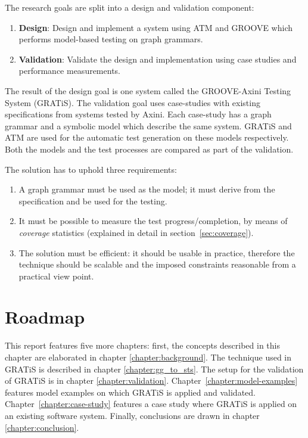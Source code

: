 The research goals are split into a design and validation component:
\begin{enumerate}
    \item \textbf{Design}: Design and implement a system using ATM and GROOVE which performs model-based testing on graph grammars.
    \item \textbf{Validation}: Validate the design and implementation using case studies and performance measurements.
\end{enumerate}

The result of the design goal is one system called the GROOVE-Axini Testing System (GRATiS). The validation goal uses case-studies with existing specifications from systems tested by Axini. Each case-study has a graph grammar and a symbolic model which describe the same system. GRATiS and ATM are used for the automatic test generation on these models respectively. Both the models and the test processes are compared as part of the validation.

The solution has to uphold three requirements:
\begin{enumerate}
\item A graph grammar must be used as the model; it must derive from the specification and be used for the testing.
\item It must be possible to measure the test progress/completion, by means of \textit{coverage} statistics (explained in detail in section~\ref{sec:coverage}).
\item The solution must be efficient: it should be usable in practice, therefore the technique should be scalable and the imposed constraints reasonable from a practical view point.
\end{enumerate}

\section{Roadmap}
This report features five more chapters: first, the concepts described in this chapter are elaborated in chapter \ref{chapter:background}. The technique used in GRATiS is described in chapter \ref{chapter:gg_to_sts}. The setup for the validation of GRATiS is in chapter \ref{chapter:validation}. Chapter~\ref{chapter:model-examples} features model examples on which GRATiS is applied and validated. Chapter~\ref{chapter:case-study} features a case study where GRATiS is applied on an existing software system. Finally, conclusions are drawn in chapter \ref{chapter:conclusion}.
